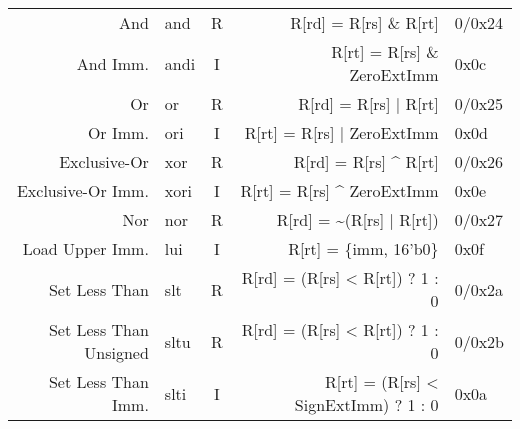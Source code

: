 \begin{tabularx}{\textwidth}{NMcDO}
    And                                                 & and                                      & R & R[rd] = R[rs] \& R[rt]                                                                            & 0/0x24 \\
    And Imm.                                            & andi                                     & I & R[rt] = R[rs] \& ZeroExtImm                                      \footnotemark[3]                 & 0x0c   \\
    Or                                                  & or                                       & R & R[rd] = R[rs] | R[rt]                                                                             & 0/0x25 \\
    Or Imm.                                             & ori                                      & I & R[rt] = R[rs] | ZeroExtImm                                       \footnotemark[3]                 & 0x0d   \\
    Exclusive-Or                                        & xor                                      & R & R[rd] = R[rs] \textasciicircum{} R[rt]                                                            & 0/0x26 \\
    Exclusive-Or Imm.                                   & xori                                     & I & R[rt] = R[rs] \textasciicircum{} ZeroExtImm                      \footnotemark[3]                 & 0x0e   \\
    Nor                                                 & nor                                      & R & R[rd] = \textasciitilde (R[rs] | R[rt])                                                           & 0/0x27 \\
    Load Upper Imm.                                     & lui                                      & I & R[rt] = \{imm, 16'b0\}                                                                            & 0x0f   \\
    \midrule
    Set Less Than                                       & slt                                      & R & R[rd] = (R[rs] < R[rt]) ? 1 : 0                                                                   & 0/0x2a \\
    Set Less Than Unsigned                              & sltu                                     & R & R[rd] = (R[rs] < R[rt]) ? 1 : 0                                  \footnotemark[6]                 & 0/0x2b \\
    Set Less Than Imm.                                  & slti                                     & I & R[rt] = (R[rs] < SignExtImm) ? 1 : 0                             \footnotemark[2]                 & 0x0a   \\

\end{tabularx}
